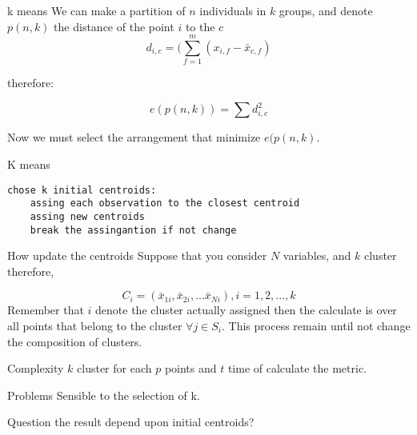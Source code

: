 \documentclass{beamer}
\begin{document}
\begin{frame}{k means}
We can make a partition of $n$ individuals in $k$ groups, and denote $p(n,k)$
the distance of the point $i$ to the $c$ 
\begin{equation}
d_{i,c} = ( \sum_{f=1}^{m}(x_{i,f} - \bar{x}_{c,f})
\end{equation}

therefore:

\begin{equation}
e(p(n,k)) = \sum d_{i,c}^{2}
\end{equation}

Now we must select the arrangement that minimize $e(p(n,k)$.

\end{frame}




\begin{frame}[fragile]{K means}

\begin{verbatim}
chose k initial centroids:
	assing each observation to the closest centroid
	assing new centroids 
	break the assingantion if not change 
\end{verbatim}
\end{frame}




\begin{frame}{How update the centroids}
Suppose that you consider $N$ variables, and $k$ cluster therefore, 

\begin{equation}
C_{i} = (\bar{x}_{1i},\bar{x}_{2i},...\bar{x}_{Ni}), i=1,2,...,k
\end{equation}
Remember that $i$ denote the cluster actually assigned then the calculate is over all points that belong to the cluster $\forall j \in S_{i}$.
This process remain until not change the composition of clusters.
\end{frame}








\begin{frame}{Complexity }
$k$ cluster for each $p$ points and $t$ time of calculate the metric.
\end{frame}


\begin{frame}{Problems}
Sensible to the selection of k.
\begin{block}{Question}
the result depend upon initial centroids?
\end{block}

\end{frame}
\end{document}
